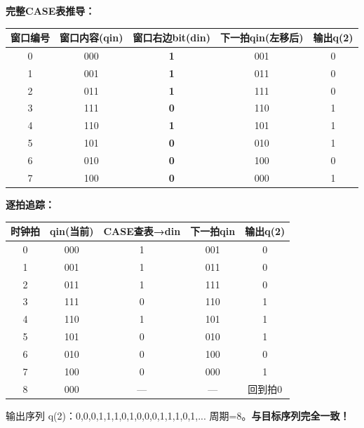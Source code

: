 \textbf{完整CASE表推导：}
\begin{center}
\begin{tabular}{|c|c|c|c|c|}
\hline
窗口编号 & 窗口内容(qin) & 窗口右边bit(din) & 下一拍qin(左移后) & 输出q(2) \\
\hline
0 & 000 & \textbf{1} & 001 & 0 \\
1 & 001 & \textbf{1} & 011 & 0 \\
2 & 011 & \textbf{1} & 111 & 0 \\
3 & 111 & \textbf{0} & 110 & 1 \\
4 & 110 & \textbf{1} & 101 & 1 \\
5 & 101 & \textbf{0} & 010 & 1 \\
6 & 010 & \textbf{0} & 100 & 0 \\
7 & 100 & \textbf{0} & 000 & 1 \\
\hline
\end{tabular}
\end{center}

\textbf{逐拍追踪：}
\begin{center}
\begin{tabular}{|c|c|c|c|c|}
\hline
时钟拍 & qin(当前) & CASE查表→din & 下一拍qin & 输出q(2) \\
\hline
0 & 000 & 1 & 001 & 0 \\
1 & 001 & 1 & 011 & 0 \\
2 & 011 & 1 & 111 & 0 \\
3 & 111 & 0 & 110 & 1 \\
4 & 110 & 1 & 101 & 1 \\
5 & 101 & 0 & 010 & 1 \\
6 & 010 & 0 & 100 & 0 \\
7 & 100 & 0 & 000 & 1 \\
8 & 000 & — & — & 回到拍0 \\
\hline
\end{tabular}
\end{center}

输出序列 q(2)：0,0,0,1,1,1,0,1,0,0,0,1,1,1,0,1,... 周期=8。\textbf{与目标序列完全一致！}

